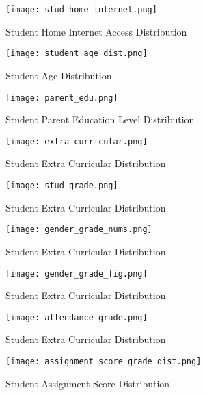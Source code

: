 \begin{figure}[H]
	\centering %
	\texttt{[image: stud\_home\_internet.png]}
	\caption{Student Home Internet Access Distribution \label{fig:stud_home_internet}}
\end{figure}
\begin{figure}[H]
	\centering %
	\texttt{[image: student\_age\_dist.png]}
	\caption{Student Age Distribution \label{fig:stud_age_dist}}
\end{figure}
\begin{figure}[H]
	\centering %
	\texttt{[image: parent\_edu.png]}
	\caption{Student Parent Education Level Distribution \label{fig:parent_edu}}
\end{figure}


\begin{figure}[H]
	\centering %
	\texttt{[image: extra\_curricular.png]}
	\caption{Student Extra Curricular Distribution \label{fig:extra_curricular}}
\end{figure}

\begin{figure}[H]
	\centering %
	\texttt{[image: stud\_grade.png]}
	\caption{Student Extra Curricular Distribution \label{fig:stud_grade}}
\end{figure}


\begin{figure}[H]
	\centering %
	\texttt{[image: gender\_grade\_nums.png]}
	\caption{Student Extra Curricular Distribution \label{fig:gender_grade_nums}}
\end{figure}


\begin{figure}[H]
	\centering %
	\texttt{[image: gender\_grade\_fig.png]}
	\caption{Student Extra Curricular Distribution \label{fig:gender_grade_fig}}
\end{figure}




\begin{figure}[H]
	\centering %
	\texttt{[image: attendance\_grade.png]}
	\caption{Student Extra Curricular Distribution \label{fig:attendance_grade}}
\end{figure}

\begin{figure}[H]
	\centering %
	\texttt{[image: assignment\_score\_grade\_dist.png]}
	\caption{Student Assignment Score Distribution \label{fig:assignment_score_grade_dist}}
\end{figure}



